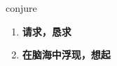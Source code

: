 
\begin{frame}
{\huge conjure}
\begin{center}
\begin{enumerate}\Large
  \item \textbf{请求，恳求}
  \item \textbf{在脑海中浮现，想起}
\end{enumerate}
\end{center}
\end{frame}
